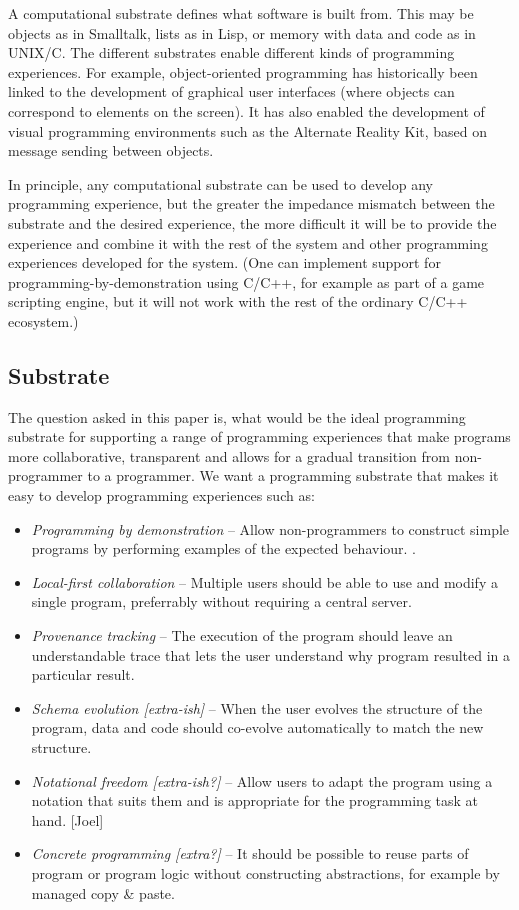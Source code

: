 \documentclass[sigconf]{acmart}
\begin{document}
A computational substrate defines what software is built from. This may be objects as in
Smalltalk, lists as in Lisp, or memory with data and code as in UNIX/C.
The different substrates enable different kinds of programming experiences.
For example, object-oriented programming has historically been linked to the development
of graphical user interfaces (where objects can correspond to elements on the screen).
It has also enabled the development of visual programming environments such as the Alternate
Reality Kit, based on message sending between objects.

In principle, any computational substrate can be used to develop any programming experience,
but the greater the impedance mismatch between the substrate and the desired experience,
the more difficult it will be to provide the experience and combine it with the rest of the
system and other programming experiences developed for the system. (One can implement support
for programming-by-demonstration using C/C++, for example as part of a game scripting engine,
but it will not work with the rest of the ordinary C/C++ ecosystem.)

\subsection{Substrate}

The question asked in this paper is, what would be the ideal programming substrate
for supporting a range of programming experiences that make programs more
collaborative, transparent and allows for a gradual transition from non-programmer
to a programmer. We want a programming substrate that makes it easy to develop
programming experiences such as:

\begin{itemize}
\item \emph{Programming by demonstration} --
  Allow non-programmers to construct simple programs by performing examples of the expected behaviour. \cite{leiva-2021-rapido}.
\item \emph{Local-first collaboration} --
  Multiple users should be able to use and modify a single program, preferrably without requiring a central server. \cite{kleppmann-2019-local}
\item \emph{Provenance tracking} --
  The execution of the program should leave an understandable trace that lets the user understand why program resulted in a particular result.
\item \emph{Schema evolution [extra-ish]} --
  When the user evolves the structure of the program, data and code should co-evolve automatically to match the new structure.
\item \emph{Notational freedom [extra-ish?]} --
  Allow users to adapt the program using a notation that suits them and is appropriate for the programming task at hand. [Joel]
\item \emph{Concrete programming [extra?]} --
  It should be possible to reuse parts of program or program logic without constructing abstractions, for example by managed copy \& paste.\cite{edwards-2006-copypaste,edwards-2022-copypaste}
\end{itemize}
\end{document}
